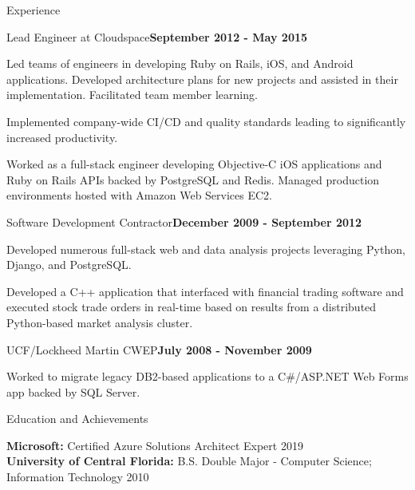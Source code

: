\documentclass{resume} %
\begin{document}
\begin{rSection}{Experience}

\begin{rSubsection}{Lead Engineer at Cloudspace}{\bf September 2012 - May 2015}{}{}

\item Led teams of engineers in developing Ruby on Rails, iOS, and Android applications.  Developed architecture plans for new projects and assisted in their implementation. Facilitated team member learning.
\item Implemented company-wide CI/CD and quality standards leading to significantly increased productivity.
\item Worked as a full-stack engineer developing Objective-C iOS applications and Ruby on Rails APIs backed by PostgreSQL and Redis. Managed production environments hosted with Amazon Web Services EC2.

\end{rSubsection}


\begin{rSubsection}{Software Development Contractor}{\bf December 2009 - September 2012}{}{}

\item Developed numerous full-stack web and data analysis projects leveraging Python, Django, and PostgreSQL.
\item Developed a C++ application that interfaced with financial trading software and executed stock trade orders in real-time based on results from a distributed Python-based market analysis cluster.

\end{rSubsection}


\begin{rSubsection}{UCF/Lockheed Martin CWEP}{\bf July 2008 - November 2009}{}{}

\item Worked to migrate legacy DB2-based applications to a C\#/ASP.NET Web Forms app backed by SQL Server.

\end{rSubsection}


\end{rSection}


\begin{rSection}{Education and Achievements}

{\bf Microsoft: } Certified Azure Solutions Architect Expert \hfill 2019 \\ 
{\bf University of Central Florida:} B.S. Double Major - Computer Science; Information Technology  \hfill 2010 \\ 
\end{rSection}
\end{document}
